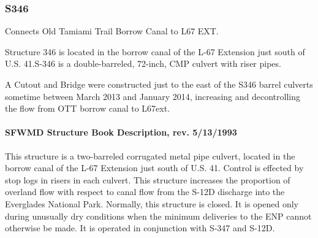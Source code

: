 
\clearpage
\subsubsection{S346}
Connects Old Tamiami Trail Borrow Canal to L67 EXT.

Structure 346 is located in the borrow canal of the L-67 Extension just south of U.S. 41.S-346 is a double-barreled, 72-inch, CMP culvert with riser pipes.

A Cutout and Bridge were constructed just to the east of the S346 barrel culverts sometime between March 2013 and January 2014, increasing and decontrolling the flow from OTT borrow canal to L67ext.

\paragraph{SFWMD Structure Book Description, rev. 5/13/1993}
This structure is a two-barreled corrugated metal pipe culvert, located in the borrow canal of the L-67 Extension just south of U.S. 41. Control is effected by stop logs in risers in each culvert.
This structure increases the proportion of overland flow with respect to canal flow from the S-12D discharge into the Everglades National Park.
Normally, this structure is closed. It is opened only during unusually dry conditions when the minimum deliveries to the ENP cannot otherwise be made. It is operated in conjunction with S-347 and S-12D.




